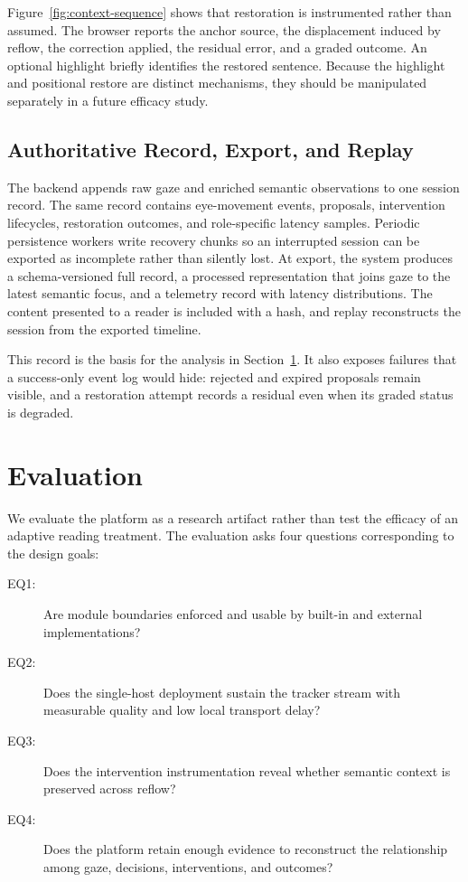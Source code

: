 \documentclass[sigconf,review,anonymous]{acmart}
\begin{document}
Figure~\ref{fig:context-sequence} shows that restoration is instrumented rather than assumed.
The browser reports the anchor source, the displacement induced by reflow, the correction applied, the residual error, and a graded outcome.
An optional highlight briefly identifies the restored sentence.
Because the highlight and positional restore are distinct mechanisms, they should be manipulated separately in a future efficacy study.

\subsection{Authoritative Record, Export, and Replay}

The backend appends raw gaze and enriched semantic observations to one session record.
The same record contains eye-movement events, proposals, intervention lifecycles, restoration outcomes, and role-specific latency samples.
Periodic persistence workers write recovery chunks so an interrupted session can be exported as incomplete rather than silently lost.
At export, the system produces a schema-versioned full record, a processed representation that joins gaze to the latest semantic focus, and a telemetry record with latency distributions.
The content presented to a reader is included with a hash, and replay reconstructs the session from the exported timeline.

This record is the basis for the analysis in Section~\ref{sec:evaluation}.
It also exposes failures that a success-only event log would hide: rejected and expired proposals remain visible, and a restoration attempt records a residual even when its graded status is degraded.

\section{Evaluation}
\label{sec:evaluation}

We evaluate the platform as a research artifact rather than test the efficacy of an adaptive reading treatment.
The evaluation asks four questions corresponding to the design goals:

\begin{description}
    \item[EQ1:] Are module boundaries enforced and usable by built-in and external implementations?
    \item[EQ2:] Does the single-host deployment sustain the tracker stream with measurable quality and low local transport delay?
    \item[EQ3:] Does the intervention instrumentation reveal whether semantic context is preserved across reflow?
    \item[EQ4:] Does the platform retain enough evidence to reconstruct the relationship among gaze, decisions, interventions, and outcomes?
\end{description}
\end{document}
